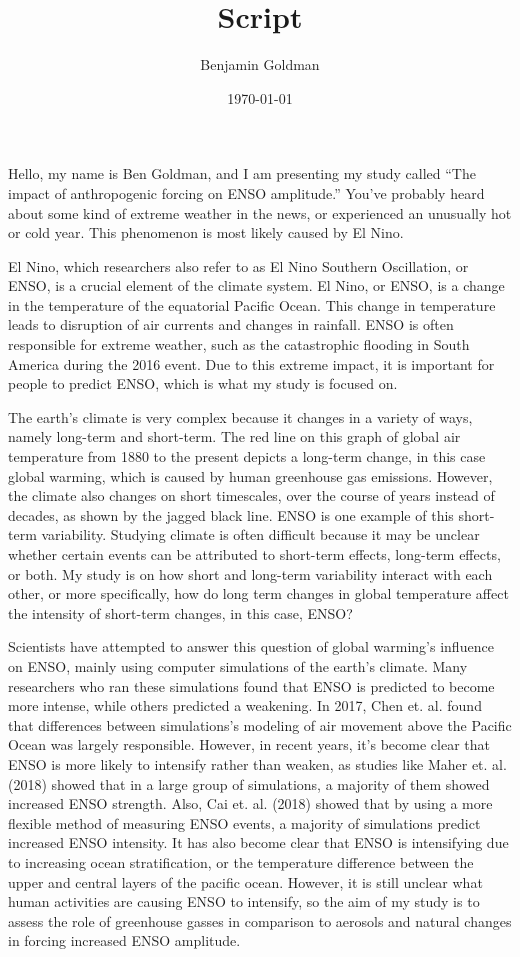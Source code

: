 \documentclass{basic}
\author{Benjamin Goldman}
\date{\today}
\title{Script}
\begin{document}
\maketitle
Hello, my name is Ben Goldman, and I am presenting my study called ``The impact of anthropogenic forcing on ENSO amplitude.'' You've probably heard about some kind of extreme weather in the news, or experienced an unusually hot or cold year. This phenomenon is most likely caused by El Nino.

El Nino, which researchers also refer to as El Nino Southern Oscillation, or ENSO, is a crucial element of the climate system. El Nino, or ENSO, is a change in the temperature of the equatorial Pacific Ocean. This change in temperature leads to disruption of air currents and changes in rainfall. ENSO is often responsible for extreme weather, such as the catastrophic flooding in South America during the 2016 event. Due to this extreme impact, it is important for people to predict ENSO, which is what my study is focused on.

The earth's climate is very complex because it changes in a variety of ways, namely long-term and short-term. The red line on this graph of global air temperature from 1880 to the present depicts a long-term change, in this case global warming, which is caused by human greenhouse gas emissions. However, the climate also changes on short timescales, over the course of years instead of decades, as shown by the jagged black line. ENSO is one example of this short-term variability. Studying climate is often difficult because it may be unclear whether certain events can be attributed to short-term effects, long-term effects, or both. My study is on how short and long-term variability interact with each other, or more specifically, how do long term changes in global temperature affect the intensity of short-term changes, in this case, ENSO?

Scientists have attempted to answer this question of global warming's influence on ENSO, mainly using computer simulations of the earth's climate. Many researchers who ran these simulations found that ENSO is predicted to become more intense, while others predicted a weakening. In 2017, Chen et. al. found that differences between simulations's modeling of air movement above the Pacific Ocean was largely responsible. However, in recent years, it's become clear that ENSO is more likely to intensify rather than weaken, as studies like Maher et. al. (2018) showed that in a large group of simulations, a majority of them showed increased ENSO strength. Also, Cai et. al. (2018) showed that by using a more flexible method of measuring ENSO events, a majority of simulations predict increased ENSO intensity. It has also become clear that ENSO is intensifying due to increasing ocean stratification, or the temperature difference between the upper and central layers of the pacific ocean. However, it is still unclear what human activities are causing ENSO to intensify, so the aim of my study is to assess the role of greenhouse gasses in comparison to aerosols and natural changes in forcing increased ENSO amplitude.
\end{document}
